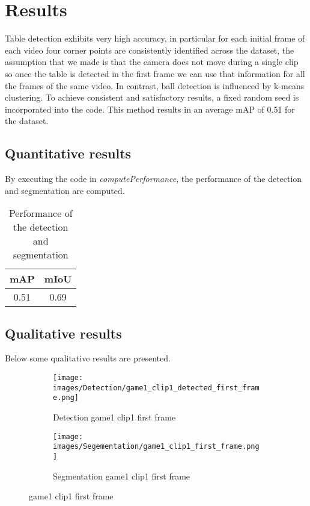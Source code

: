 \section{Results}

Table detection exhibits very high accuracy, in particular for each initial frame of each video four corner points are consistently identified across the dataset, the assumption that we made is that the camera does not move during a single clip so once the table is detected in the first frame we can use that information for all the frames of the same video.
In contrast, ball detection is influenced by k-means clustering. To achieve consistent and satisfactory results, a fixed random seed is incorporated into the code. This method results in an average mAP of 0.51 for the dataset.

\subsection{Quantitative results}
By executing the code in \textit{computePerformance}, the performance of the detection and segmentation are computed.
\begin{table}
	\centering
    \begin{tabular}{|c|c|}
        \hline
        mAP & mIoU \\
        \hline
        0.51 & 0.69 \\
        \hline
    \end{tabular}
    \caption{Performance of the detection and segmentation}
    \label{tab: performance}
\end{table}

\subsection{Qualitative results}
Below some qualitative results are presented.
\begin{figure}
    \centering
    \begin{subfigure}[b]{0.45\textwidth}
        \centering
        \texttt{[image: images/Detection/game1\_clip1\_detected\_first\_frame.png]}
        \caption{Detection game1 clip1 first frame}
        \label{fig: game1_clip1_first_frame_detected}
    \end{subfigure}
    \begin{subfigure}[b]{0.45\textwidth}
        \centering
        \texttt{[image: images/Segementation/game1\_clip1\_first\_frame.png]}
        \caption{Segmentation game1 clip1 first frame}
		\label{fig: game1_clip1_first_frame_segmented}
    \end{subfigure}
	\caption{game1 clip1 first frame}
\end{figure}


